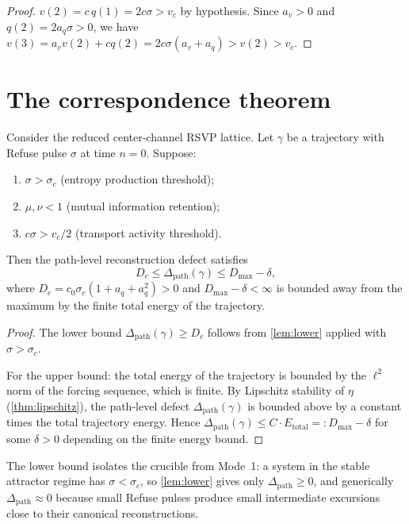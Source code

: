 \documentclass[12pt, oneside]{memoir}
\newcommand{\Dpth}{\Delta_{\mathrm{path}}}
\newcommand{\aq}{a_q}
\newcommand{\av}{a_v}
\begin{document}
\begin{proof}
$v(2) = c\, q(1) = 2c\sigma > v_c$ by hypothesis.  Since $\av > 0$ and $q(2) =
2\aq\sigma > 0$, we have $v(3) = \av v(2) + c q(2) = 2c\sigma(\av + \aq) > v(2) > v_c$.
\end{proof}

\section{The correspondence theorem}

\begin{theorem}
\label{thm:bridge}
Consider the reduced center-channel RSVP lattice.  Let $\gamma$ be a trajectory with
Refuse pulse $\sigma$ at time $n = 0$.  Suppose:
\begin{enumerate}
  \item[\textup{(i)}] $\sigma > \sigma_c$ \textup{(entropy production threshold)};
  \item[\textup{(ii)}] $\mu, \nu < 1$ \textup{(mutual information retention)};
  \item[\textup{(iii)}] $c\sigma > v_c/2$ \textup{(transport activity threshold)}.
\end{enumerate}
Then the path-level reconstruction defect satisfies
\begin{equation}
  D_c \le \Dpth(\gamma) \le D_{\max} - \delta,
\end{equation}
where $D_c = c_0 \sigma_c (1 + \aq + \aq^2) > 0$ and $D_{\max} - \delta < \infty$ is
bounded away from the maximum by the finite total energy of the trajectory.
\end{theorem}

\begin{proof}
The lower bound $\Dpth(\gamma) \ge D_c$ follows from \cref{lem:lower} applied with
$\sigma > \sigma_c$.

For the upper bound: the total energy of the trajectory is bounded by the $\ell^2$ norm
of the forcing sequence, which is finite.  By Lipschitz stability of $\eta$
(\cref{thm:lipschitz}), the path-level defect $\Dpth(\gamma)$ is bounded above by a
constant times the total trajectory energy.  Hence $\Dpth(\gamma) \le C \cdot E_{\mathrm{total}}
=: D_{\max} - \delta$ for some $\delta > 0$ depending on the finite energy bound.
\end{proof}

The lower bound isolates the crucible from Mode~1: a system in the stable attractor
regime has $\sigma < \sigma_c$, so \cref{lem:lower} gives only $\Dpth \ge 0$, and
generically $\Dpth \approx 0$ because small Refuse pulses produce small intermediate
excursions close to their canonical reconstructions.
\end{document}

